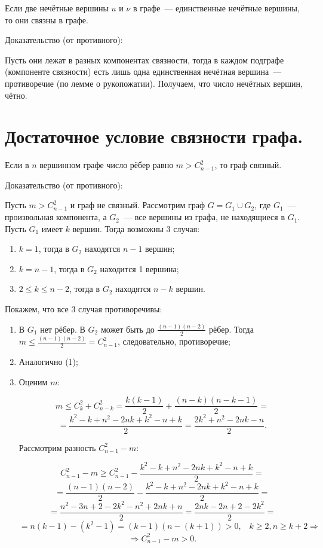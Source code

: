     Если две нечётные вершины $u$ и $\nu$ в графе~--- единственные нечётные вершины,
    то они связны в графе.
    \bigskip

    Доказательство (от противного):
    \bigskip

    Пусть они лежат в разных компонентах связности, тогда в каждом подграфе
    (компоненте связности) есть лишь одна единственная нечётная вершина~--- 
    противоречие (по лемме о рукопожатии). Получаем, что число нечётных вершин,
    чётно.

\section{Достаточное условие связности графа.}

Если в $n$ вершинном графе число рёбер равно $m > C^2_{n - 1}$, то граф
связный.
\bigskip

Доказательство (от противного):
\bigskip

Пусть $m > C^2_{n - 1}$ и граф не связный. Рассмотрим граф $G = G_1 \cup G_2$,
где $G_1$~--- произвольная компонента, а $G_2$~--- все вершины из графа,
не находящиеся в $G_1$. Пусть $G_1$ имеет $k$ вершин. Тогда возможны 3 случая:

\begin{enumerate}
    \item{$k = 1$, тогда в $G_2$ находятся $n - 1$ вершин;}
    \item{$k = n - 1$, тогда в $G_2$ находится 1 вершина;}
    \item{$2 \leq  k \leq n - 2$, тогда в $G_2$ находятся $n - k$ вершин.}
\end{enumerate}
\smallskip

Покажем, что все 3 случая противоречивы:
\smallskip

\begin{enumerate}
    \item{В $G_1$ нет рёбер. В $G_2$ может быть до $\frac{(n - 1)(n - 2)}{2}$
    рёбер. Тогда $m \leq \frac{(n - 1)(n - 2)}{2} = C^2_{n - 1}$, следовательно,
    противоречие;}
    \item{Аналогично (1);}
    \item{Оценим $m$:
    \bigskip
    
    \[
        m \leq C^2_k + C^2_{n - k} = \frac{k (k - 1)}{2} + \frac{(n - k)(n - k - 1)}{2}
        = 
    \]
    \[   
        =
        \frac{k^2 - k + n^2 - 2nk + k^2 - n + k}{2} = \frac{2k^2 + n^2 - 2nk - n}{2}.  
    \]
    \smallskip
    
    Рассмотрим разность $C^2_{n - 1} - m$:
    \bigskip
    
    \[
        C^2_{n - 1} - m \geq C^2_{n - 1} - \frac{k^2 - k + n^2 - 2nk + k^2 - n + k}{2} = 
    \]
    \[
        = \frac{(n - 1)(n - 2)}{2} - \frac{k^2 - k + n^2 - 2nk + k^2 - n + k}{2} =
    \]  
    \[
        = \frac{n^2 - 3n + 2 - 2k^2 - n^2 + 2nk + n}{2} = \frac{2nk - 2n + 2 - 2k^2}{2} =  
    \]
    \[
        = n(k - 1) - (k^2 - 1) = (k - 1)(n - (k + 1)) > 0, \;\;\; k \geq 2, n \geq k + 2
        \Rightarrow     
    \]
    \[
        \Rightarrow C^2_{n - 1} - m > 0.  
    \]}
\end{enumerate}

